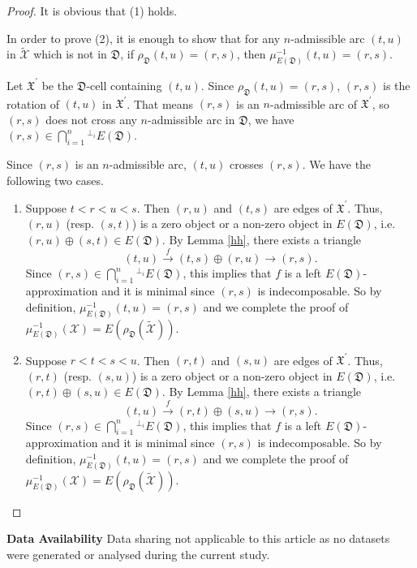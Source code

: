 \documentclass[a4paper,reqno,11pt]{amsart}
\theoremstyle{definition}
\def\X{\mathcal{X}}
\def\XX{\widetilde{\X}}
\begin{document}
\begin{proof}
It is obvious that (1) holds.

In order to prove (2), it is enough to show that for any $n$-admissible arc $(t,u)$ in $\XX$ which is not in $\mathfrak{D}$, if $\rho_{\mathfrak{D}}(t,u)=(r,s)$, then $\mu^{-1}_{E(\mathfrak{D})}(t,u)=(r,s)$.

Let $\mathfrak{X}^\prime$ be the $\mathfrak{D}$-cell containing $(t,u)$. Since $\rho_{\mathfrak{D}}(t,u)=(r,s)$, $(r,s)$ is the rotation of $(t,u)$ in $\mathfrak{X}^\prime$. That means $(r,s)$ is an $n$-admissible arc of $\mathfrak{X}^\prime$, so $(r,s)$ does not cross any  $n$-admissible arc in $\mathfrak{D}$, we have $(r,s)\in\bigcap\limits_{i=1}^{n}{^{\perp_i}} E(\mathfrak{D})$.

Since $(r,s)$ is an $n$-admissible arc, $(t,u)$ crosses $(r,s)$. We have the following two cases.
\begin{enumerate}
  \item[(1)] Suppose $t<r<u<s$. Then $(r,u)$ and $(t, s)$ are edges of $\mathfrak{X}^\prime$. Thus, $(r,u)$ (resp. $(s,t)$) is  a zero object or a non-zero object in $E(\mathfrak{D})$, i.e. $(r,u)\oplus (s,t)\in E(\mathfrak{D})$. By Lemma \ref{hh}, there exists a triangle
   $$(t,u)\xrightarrow{f}(t,s)\oplus (r,u)\rightarrow (r,s).$$
   Since $(r,s)\in\bigcap\limits_{i=1}^{n}{^{\perp_i}}E(\mathfrak{D})$, this implies that $f$ is a left $E(\mathfrak{D})$-approximation and it is minimal since $(r,s)$ is indecomposable. So by definition, $\mu^{-1}_{E(\mathfrak{D})}(t,u)=(r,s)$ and we complete the proof of $\mu^{-1}_{E(\mathfrak{D})}(\X)=E(\rho_{\mathfrak{D}}(\XX)).$
  \item [(2)] Suppose $r<t<s<u$. Then $(r,t)$ and $(s, u)$ are edges of $\mathfrak{X}^\prime$. Thus, $(r,t)$ (resp. $(s,u)$) is  a zero object or a non-zero object in $E(\mathfrak{D})$, i.e. $(r,t)\oplus (s,u)\in E(\mathfrak{D})$. By Lemma \ref{hh}, there exists a triangle
   $$(t,u)\xrightarrow{f} (r,t)\oplus (s,u)\rightarrow (r,s).$$
   Since $(r,s)\in\bigcap\limits_{i=1}^{n}{^{\perp_i}}E(\mathfrak{D})$, this implies that $f$ is a left $E(\mathfrak{D})$-approximation and it is minimal since $(r,s)$ is indecomposable. So by definition, $\mu^{-1}_{E(\mathfrak{D})}(t,u)=(r,s)$ and we complete the proof of $\mu^{-1}_{E(\mathfrak{D})}(\X)=E(\rho_{\mathfrak{D}}(\XX)).$
\end{enumerate}
\end{proof}



\vspace{1cm}
\hspace{-5mm}\textbf{Data Availability}\hspace{2mm} Data sharing not applicable to this article as no datasets were generated or analysed during
the current study.
\vspace{2mm}
\end{document}

